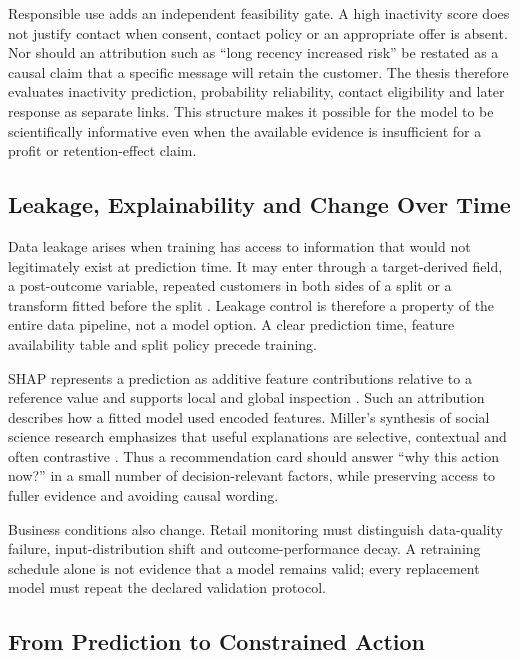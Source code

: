 Responsible use adds an independent feasibility gate. A high inactivity score
does not justify contact when consent, contact policy or an appropriate offer is
absent. Nor should an attribution such as ``long recency increased risk'' be
restated as a causal claim that a specific message will retain the customer.
The thesis therefore evaluates inactivity prediction, probability reliability,
contact eligibility and later response as separate links. This structure makes
it possible for the model to be scientifically informative even when the
available evidence is insufficient for a profit or retention-effect claim.

\subsection{Leakage, Explainability and Change Over Time}

Data leakage arises when training has access to information that would not
legitimately exist at prediction time. It may enter through a target-derived
field, a post-outcome variable, repeated customers in both sides of a split or a
transform fitted before the split \cite{kaufman2012leakage}. Leakage control is
therefore a property of the entire data pipeline, not a model option. A clear
prediction time, feature availability table and split policy precede training.

SHAP represents a prediction as additive feature contributions relative to a
reference value and supports local and global inspection
\cite{lundberg2017shap}. Such an attribution
describes how a fitted model used encoded features. Miller's synthesis of social
science research emphasizes that useful explanations are selective, contextual
and often contrastive \cite{miller2019explanation}. Thus a recommendation card
should answer ``why this action now?'' in a small number of decision-relevant
factors, while preserving access to fuller evidence and avoiding causal wording.

Business conditions also change. Retail monitoring must distinguish data-quality
failure, input-distribution shift and outcome-performance decay. A retraining
schedule alone is not evidence that a model remains valid; every replacement
model must repeat the declared validation protocol.

\subsection{From Prediction to Constrained Action}

